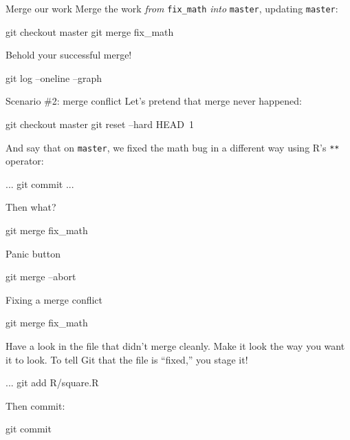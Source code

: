\begin{frame}[fragile]{Merge our work}
  Merge the work \emph{from} \texttt{fix\_math} \emph{into} \texttt{master}, updating \texttt{master}:

  \begin{gitCommand}
git checkout master
git merge fix_math
  \end{gitCommand}

  Behold your successful merge!

  \begin{gitCommand}git log --oneline --graph\end{gitCommand}
\end{frame}

\begin{frame}[fragile]{Scenario \#2: merge conflict}
  Let's pretend that merge never happened:

  \begin{gitCommand}
git checkout master
git reset --hard HEAD~1
  \end{gitCommand}

  And say that on \texttt{master}, we fixed the math bug in a
  different way using R's \texttt{**} operator:

  \begin{gitCommand}
...
git commit ...
  \end{gitCommand}

  Then what?

  \begin{gitCommand}git merge fix_math\end{gitCommand}
\end{frame}

\begin{frame}[fragile]{Panic button}
  \begin{gitCommand}git merge --abort\end{gitCommand}
\end{frame}

\begin{frame}[fragile]{Fixing a merge conflict}
  \begin{gitCommand}git merge fix_math\end{gitCommand}

  Have a look in the file that didn't merge cleanly. Make it look the
  way you want it to look. To tell Git that the file is ``fixed,'' you
  stage it!

  \begin{gitCommand}
...
git add R/square.R
  \end{gitCommand}

  Then commit:

  \begin{gitCommand}git commit\end{gitCommand}

\end{frame}

